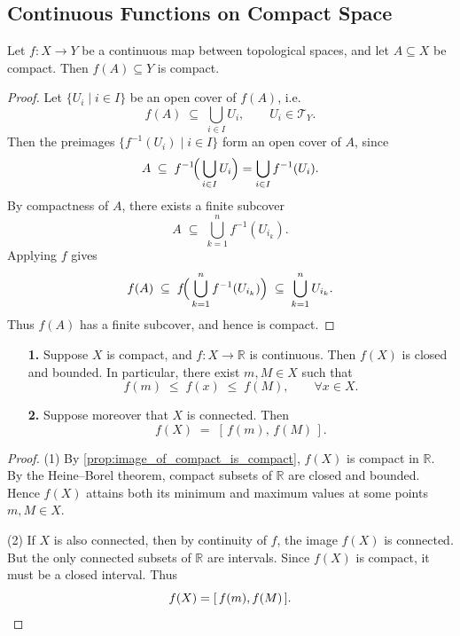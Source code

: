 \subsection{Continuous Functions on Compact Space}

\begin{proposition}\label{prop:image_of_compact_is_compact}
Let \(f : X \to Y\) be a continuous map between topological spaces, and let \(A \subseteq X\) be compact.  
Then \(f(A) \subseteq Y\) is compact.
\end{proposition}

\begin{proof}
Let \(\{U_i \mid i \in I\}\) be an open cover of \(f(A)\), i.e.
\[
f(A) \;\subseteq\; \bigcup_{i \in I} U_i, 
\qquad U_i \in \mathcal{T}_Y.
\]
Then the preimages \(\{ f^{-1}(U_i) \mid i \in I \}\) form an open cover of \(A\), since
\[
A \;\subseteq\; f^{-1}\!\Bigl(\,\bigcup_{i \in I} U_i \Bigr) 
= \bigcup_{i \in I} f^{-1}(U_i).
\]
By compactness of \(A\), there exists a finite subcover
\[
A \;\subseteq\; \bigcup_{k=1}^n f^{-1}(U_{i_k}).
\]
Applying \(f\) gives
\[
f(A) \;\subseteq\; f\!\Bigl( \,\bigcup_{k=1}^n f^{-1}(U_{i_k}) \Bigr) 
\;\subseteq\; \bigcup_{k=1}^n U_{i_k}.
\]
Thus \(f(A)\) has a finite subcover, and hence is compact.
\end{proof}

\begin{corollary}\label{cor:extreme_value}
\begin{enumerate}
\item[\textbf{1.}]
Suppose \(X\) is compact, and \(f : X \to \mathbb{R}\) is continuous.  
Then \(f(X)\) is closed and bounded.  
In particular, there exist \(m, M \in X\) such that
\[
f(m) \;\leq\; f(x) \;\leq\; f(M), \qquad \forall x \in X.
\]

\item[\textbf{2.}]
Suppose moreover that \(X\) is connected.  
Then
\[
f(X) \;=\; [\, f(m), \, f(M) \,].
\]
\end{enumerate}
\end{corollary}

\begin{proof}
(1) By \autoref{prop:image_of_compact_is_compact}, \(f(X)\) is compact in \(\mathbb{R}\).  
By the Heine--Borel theorem, compact subsets of \(\mathbb{R}\) are closed and bounded.  
Hence \(f(X)\) attains both its minimum and maximum values at some points \(m, M \in X\).  

\smallskip
(2) If \(X\) is also connected, then by continuity of \(f\), the image \(f(X)\) is connected.  
But the only connected subsets of \(\mathbb{R}\) are intervals.  
Since \(f(X)\) is compact, it must be a closed interval.  
Thus
\[
f(X) = [\, f(m), f(M) \,]. \qedhere
\]
\end{proof}

